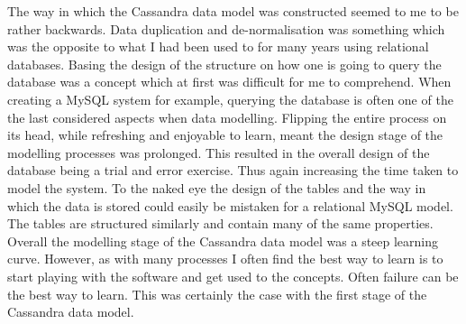 The way in which the Cassandra data model was constructed seemed to me to be rather backwards. Data duplication and de-normalisation was something which was the opposite to what I had been used to for many years using relational databases. Basing the design of the structure on how one is going to query the database was a concept which at first was difficult for me to comprehend. When creating a MySQL system for example, querying the database is often one of the the last considered aspects when data modelling. Flipping the entire process on its head, while refreshing and enjoyable to learn, meant the design stage of the modelling processes was prolonged. This resulted in the overall design of the database being a trial and error exercise. Thus again increasing the time taken to model the system. To the naked eye the design of the tables and the way in which the data is stored could easily be mistaken for a relational MySQL model. The tables are structured similarly and contain many of the same properties. Overall the modelling stage of the Cassandra data model was a steep learning curve. However, as with many processes I often find the best way to learn is to start playing with the software and get used to the concepts. Often failure can be the best way to learn. This was certainly the case with the first stage of the Cassandra data model.





